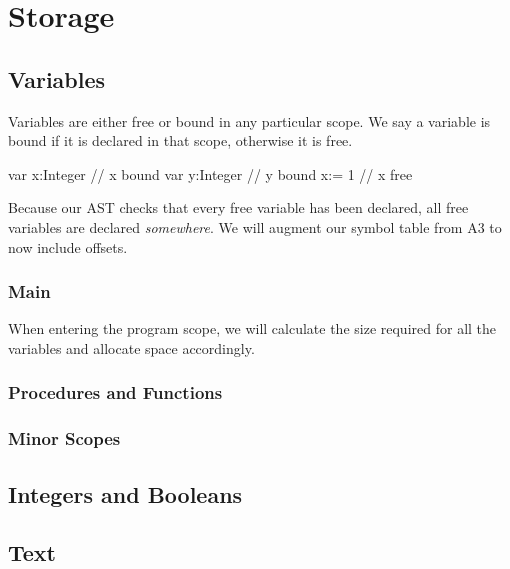 \section{Storage}
\subsection{Variables}
  Variables are either free or bound in any particular scope. We say a variable
  is bound if it is declared in that scope, otherwise it is free.

  \begin{code}
  {
    var x:Integer // x bound
    {
      var y:Integer // y bound
      x:= 1 // x free
    }
  }
  \end{code}

  Because our AST checks that every free variable has been declared, all free
  variables are declared \textit{somewhere}. We will augment our symbol table
  from A3 to now include offsets.
\subsubsection{Main}
  When entering the program scope, we will calculate the size required for all
  the variables and allocate space accordingly.
\subsubsection{Procedures and Functions}
\subsubsection{Minor Scopes}
\subsection{Integers and Booleans}
\subsection{Text}
